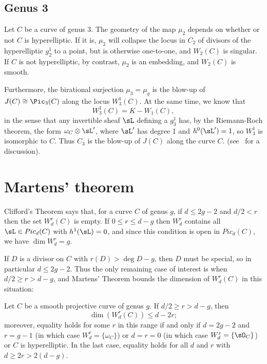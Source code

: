 \subsection{Genus 3}
\begin{fact}
 Let $C$ be a curve of genus 3. The geometry of the map $\mu_2$ depends on whether or not $C$ is hyperelliptic. If it is, $\mu_2$ will collapse the locus in $C_2$ of divisors of the hyperelliptic $g^1_2$ to a point, but is otherwise one-to-one, and $W_2(C)$ is singular.  If $C$ is not hyperelliptic, by contrast, $\mu_2$ is an embedding, and $W_2(C)$ is smooth. 


Furthermore, the birational surjection $\mu_3 = \mu_g$ is the blow-up of $J(C) \cong \Pic_3(C)$ along the locus $W^1_3(C)$. At the same time, we know that
$$
W^1_3(C) = K - W_1(C),
$$
in the sense that any invertible sheaf $\sL$ defining a $g^1_3$ has, by the Riemann-Roch theorem, the form $\omega_C\otimes \sL'$,
where $\sL'$ has degree 1 and $h^0(\sL') = 1$,
so $W^1_3$ is isomorphic to $C$. Thus $C_{3}$ is the blow-up of $J(C)$ along the curve $C$.
(see~\cite[pp. 53--4]{MumfordCJ} for a discussion).
\end{fact}

\section{Martens' theorem}

Clifford's Theorem says that, for a curve $C$ of genus $g$,  if $d\leq 2g-2$ and $d/2 < r$ then the set
 $W^r_d(C)$ is empty. If $0\leq r\leq d-g$ then $W^r_d$ contains all  $\sL\in Pic_d(C)$ with $h^1(\sL) = 0$, 
 and since this condition is open in $Pic_d(C)$, we have $\dim W^r_d = g$.
 
 If $D$ is a divisor on $C$ with  $r(D)>\deg D - g$, then $D$ must be special, so in particular $d\leq 2g-2$. 
 Thus the only remaining case of interest is when $d/2 \geq r > d-g$, and Martens' Theorem bounds the dimension of $W^r_d(C)$ in this situation:
 
\begin{theorem}\cite{Martens}\label{Martens' inequality}
Let $C$ be a smooth projective curve of genus $g$. If $d/2 \geq r > d-g$, then 
$$
\dim(W^r_d(C)) \leq d-2r;
$$
moreover, equality holds for some $r$ in this range if and only if $d=2g-2$ and $r= g-1$ (in which case $W^r_d = \{\omega_C\}$) or
$d=r=0$ (in which case $W^r_d = \{\sO_C\}$) or $C$ is hyperelliptic. In the last case, equality holds for all $d$ and $r$ with $d\geq 2r > 2(d-g)$.
\end{theorem}


